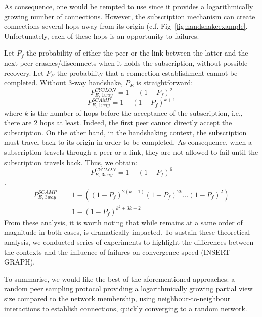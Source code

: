 As consequence, one would be tempted to use \SCAMP{} since it provides a
logarithmically growing number of connections. However, the \SCAMP{}
subscription mechanism can create connections several hops away from its origin
(c.f. Fig~\ref{fig:handshakeexample}. Unfortunately, each of these hops is an
opportunity to failures.

Let $P_f$ the probability of either the peer or the link between the latter and
the next peer crashes/disconnects when it holds the subscription, without
possible recovery. Let $P_E$ the probability that a connection establishment
cannot be completed. Without 3-way handshake, $P_E$ is straightforward:
\begin{equation} P_{E,\,1way}^{CYCLON}=1-(1- P_f)^2 \end{equation}
\begin{equation} P_{E,\,1way}^{SCAMP}=1-(1- P_f)^{k+1} \end{equation} where $k$
is the number of hops before the acceptance of the subscription, i.e., there
are 2 hops at least. Indeed, the first peer cannot directly accept the
subscription. On the other hand, in the handshaking context, the subscription
must travel back to its origin in order to be completed. As consequence, when a
subscription travels through a peer or a link, they are not allowed to fail
until the subscription travels back. Thus, we obtain:
\begin{equation} P_{E,\,3way}^{CYCLON}=1-(1- P_f)^6\end{equation}.
\begin{align} P_{E,\,3way}^{SCAMP} &=1 - ((1-P_f)^{2(k+1)} (1-P_f)^{2k}
                                     \ldots (1-P_f)^2) \\
                                   &=1-(1-P_f)^{k^2+3k+2}
\end{align}
From these analysis, it is worth noting that while \CYCLON{} remains at a same
order of magnitude in both cases, \SCAMP{} is dramatically impacted. To sustain
these theoretical analysis, we conducted series of experiments to highlight the
differences between the contexts and the influence of failures on convergence
speed (INSERT GRAPH).

To summarise, we would like the best of the aforementioned approaches: a random
peer sampling protocol providing a logarithmically growing partial view size
compared to the network membership, using neighbour-to-neighbour interactions
to establish connections, quickly converging to a random network.

